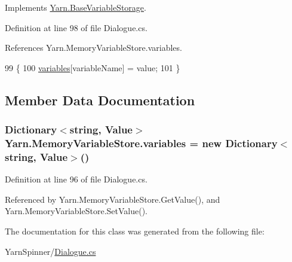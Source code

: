 Implements \hyperlink{a00036_a1c57d6d208b78abec0a670396771448e}{Yarn.\-Base\-Variable\-Storage}.



Definition at line 98 of file Dialogue.\-cs.



References Yarn.\-Memory\-Variable\-Store.\-variables.


\begin{DoxyCode}
99         \{
100             \hyperlink{a00130_aad18acd95297edb8ed496857337f8071}{variables}[variableName] = value;
101         \}
\end{DoxyCode}


\subsection{Member Data Documentation}
\hypertarget{a00130_aad18acd95297edb8ed496857337f8071}{
\subsubsection[{variables}]{\setlength{\rightskip}{0pt plus 5cm}Dictionary$<$string, {\bf Value}$>$ Yarn.\-Memory\-Variable\-Store.\-variables = new Dictionary$<$string, {\bf Value}$>$()\hspace{0.3cm}{\ttfamily [private]}}}\label{a00130_aad18acd95297edb8ed496857337f8071}


Definition at line 96 of file Dialogue.\-cs.



Referenced by Yarn.\-Memory\-Variable\-Store.\-Get\-Value(), and Yarn.\-Memory\-Variable\-Store.\-Set\-Value().



The documentation for this class was generated from the following file\-:\begin{DoxyCompactItemize}
\item 
Yarn\-Spinner/\hyperlink{a00296}{Dialogue.\-cs}\end{DoxyCompactItemize}
